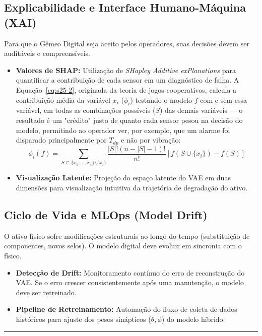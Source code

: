 \documentclass[12pt,a4paper]{article}
\numberwithin{equation}{section}
\numberwithin{table}{section}
\numberwithin{figure}{section}
\begin{document}
	\subsection{Explicabilidade e Interface Humano-Máquina (XAI)}
	Para que o Gêmeo Digital seja aceito pelos operadores, suas decisões devem ser auditáveis e compreensíveis.
	\begin{itemize}
		\item \textbf{Valores de SHAP:} Utilização de \textit{SHapley Additive exPlanations} para quantificar a contribuição de cada sensor em um diagnóstico de falha. A Equação~\eqref{eq:s25-2}, originada da teoria de jogos cooperativos, calcula a contribuição média da variável $x_i$ ($\phi_i$) testando o modelo $f$ com e sem essa variável, em todas as combinações possíveis ($S$) das demais variáveis — o resultado é um "crédito" justo de quanto cada sensor pesou na decisão do modelo, permitindo ao operador ver, por exemplo, que um alarme foi disparado principalmente por $T_{dp}$ e não por vibração:
		\begin{equation}\label{eq:s25-2}
 \phi_i(f) = \sum_{S \subseteq \{x_1, \dots, x_n\} \setminus \{x_i\}} \frac{|S|! (n - |S| - 1)!}{n!} [f(S \cup \{x_i\}) - f(S)]
\end{equation}
		\item \textbf{Visualização Latente:} Projeção do espaço latente do VAE em duas dimensões para visualização intuitiva da trajetória de degradação do ativo.
	\end{itemize}
	
	\subsection{Ciclo de Vida e MLOps (Model Drift)}
	O ativo físico sofre modificações estruturais ao longo do tempo (substituição de componentes, novos selos). O modelo digital deve evoluir em sincronia com o físico.
	\begin{itemize}
		\item \textbf{Detecção de Drift:} Monitoramento contínuo do erro de reconstrução do VAE. Se o erro crescer consistentemente após uma manutenção, o modelo deve ser retreinado.
		\item \textbf{Pipeline de Retreinamento:} Automação do fluxo de coleta de dados históricos para ajuste dos pesos sinápticos ($\theta, \phi$) do modelo híbrido.
	\end{itemize}
	
	\vspace{1em}
	\hrule
	\vspace{1em}
	
\end{document}
